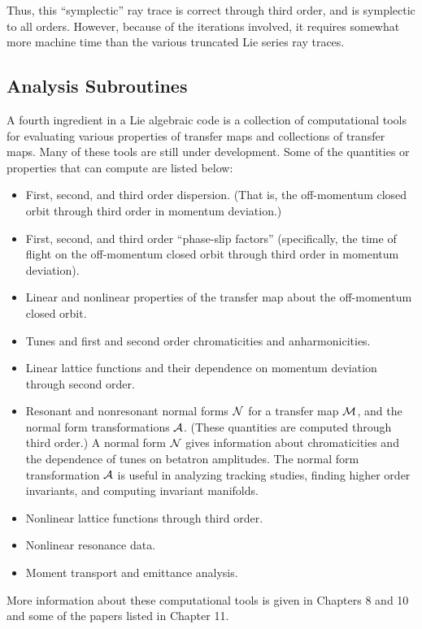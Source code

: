      Thus, this ``symplectic'' ray trace is correct through third order, and
is symplectic to all orders.  However, because of the iterations involved,
it requires somewhat more machine time than the various truncated Lie
series ray traces.

\subsection{Analysis Subroutines}

     A fourth ingredient in a Lie algebraic code is a collection of
computational tools for evaluating various properties of transfer maps and
collections of transfer maps.  Many of these tools are still under
development.  Some of the quantities or properties that  can
compute are listed below:
\begin{itemize}
  \item  First, second, and third order dispersion.  (That is, the
         off-momentum closed orbit through third order in momentum
         deviation.)
  \item  First, second, and third order ``phase-slip factors''
  (specifically, the
         time of flight on the off-momentum closed orbit through third order in momentum
         deviation).
  \item  Linear and nonlinear properties of the transfer map about the
         off-momentum closed orbit.
  \item  Tunes and first and second order chromaticities and
         anharmonicities.
  \item  Linear lattice functions and their dependence on momentum
         deviation through second order.
  \item  Resonant and nonresonant normal forms ${\cal N}$ for a transfer map
         ${\cal M}$, and
         the normal form transformations ${\cal A}$.  (These quantities are
         computed through third order.)  A normal form ${\cal N}$ gives information
         about chromaticities and the dependence of tunes on betatron
         amplitudes.  The normal form transformation  ${\cal A}$ is useful in analyzing tracking studies,
         finding higher order invariants, and computing invariant manifolds.
  \item  Nonlinear lattice functions through third order.
  \item  Nonlinear resonance data.
  \item  Moment transport and emittance analysis.
\end{itemize}
More information about these computational tools is given in Chapters 8 and
10 and some of the papers listed in Chapter 11.

